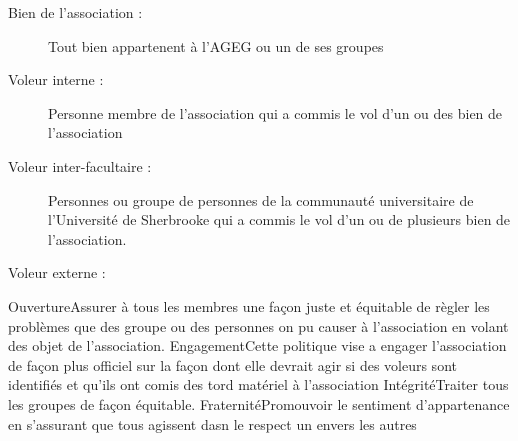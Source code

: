 
\begin{description}
\item[Bien de l'association : ]{Tout bien appartenent à l'AGEG ou un de ses groupes}
\item[Voleur interne : ]{Personne membre de l'association qui a commis le vol d'un ou des bien de l'association}
\item[Voleur inter-facultaire : ]{Personnes ou groupe de personnes de la communauté universitaire de l'Université de Sherbrooke  qui a commis le vol d'un ou de plusieurs bien de l'association.}
\item[Voleur externe : ]{}
\end{description}

\valeurs
{Ouverture}{Assurer à tous les membres une façon juste et équitable de règler les problèmes que des groupe ou des personnes on pu causer à l'association en volant des objet de l'association.}
{Engagement}{Cette politique vise a engager l'association de façon plus officiel sur la façon dont elle devrait agir si des voleurs sont identifiés et qu'ils ont comis des tord matériel à l'association}
{Intégrité}{Traiter tous les groupes de façon équitable.}
{Fraternité}{Promouvoir le sentiment d’appartenance en s'assurant que tous agissent dasn le respect un envers les autres}



